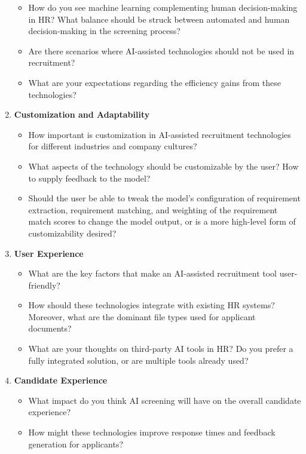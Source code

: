\documentclass[draft,final]{thesisclass} %
\begin{document}
\begin{enumerate}
    \begin{itemize}
        \item How do you see machine learning complementing human decision-making in \acs{HR}? What balance should be struck between automated and human decision-making in the screening process?
        \item Are there scenarios where \acs{AI}-assisted technologies should not be used in recruitment?
        \item What are your expectations regarding the efficiency gains from these technologies?
    \end{itemize}
    \item \textbf{Customization and Adaptability}
    \begin{itemize}
        \item How important is customization in \acs{AI}-assisted recruitment technologies for different industries and company cultures?
        \item What aspects of the technology should be customizable by the user? How to supply feedback to the model?
        \item Should the user be able to tweak the model's configuration of requirement extraction, requirement matching, and weighting of the requirement match scores to change the model output, or is a more high-level form of customizability desired?
    \end{itemize}
    \item \textbf{User Experience}
    \begin{itemize}
        \item What are the key factors that make an \acs{AI}-assisted recruitment tool user-friendly?
        \item How should these technologies integrate with existing \acs{HR} systems? Moreover, what are the dominant file types used for applicant documents?
        \item What are your thoughts on third-party \acs{AI} tools in HR? Do you prefer a fully integrated solution, or are multiple tools already used?
    \end{itemize}
    \item \textbf{Candidate Experience}
    \begin{itemize}
        \item What impact do you think \acs{AI} screening will have on the overall candidate experience?
        \item How might these technologies improve response times and feedback generation for applicants?

\end{itemize}
\end{enumerate}
\end{document}
